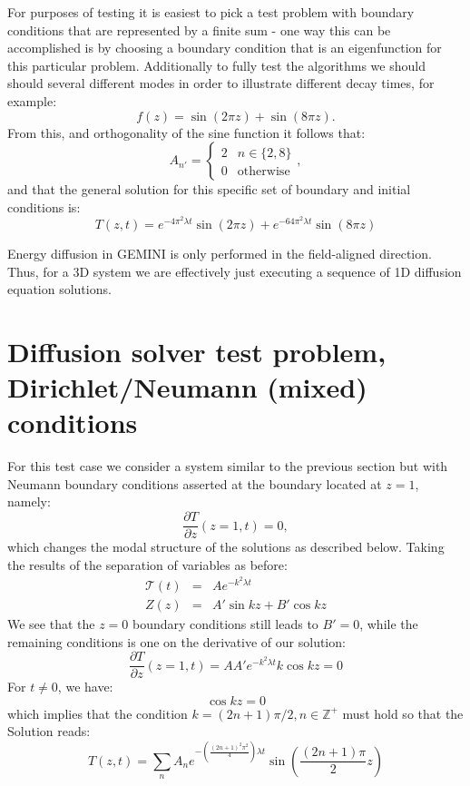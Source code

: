 \documentclass[11pt,letterpaper]{article}
\begin{document}
For purposes of testing it is easiest to pick a test problem with boundary conditions that are represented by a finite sum - one way this can be accomplished is by choosing a boundary condition that is an eigenfunction for this particular problem.  Additionally to fully test the algorithms we should should several different modes in order to illustrate different decay times, for example:  
\begin{equation}
 f(z) = \sin(2 \pi z) + \sin(8 \pi z).
\end{equation}
From this, and orthogonality of the sine function it follows that:
\begin{equation}
A_{n'} = \left\{ \begin{array}{cc} 2 & n \in \{2,8\} \\ 0 & \mathrm{otherwise}  \end{array} \right. ,
\end{equation}
and that the general solution for this specific set of boundary and initial conditions is:  
\begin{equation}
T(z,t) = e^{-4 \pi^2 \lambda t} \sin \left( 2 \pi z \right)+e^{-64 \pi^2 \lambda t} \sin \left( 8 \pi z \right)
\end{equation}

Energy diffusion in GEMINI is only performed in the field-aligned direction.  Thus, for a 3D system we are effectively just executing a sequence of 1D diffusion equation solutions.  


\section{Diffusion solver test problem, Dirichlet/Neumann (mixed) conditions}

For this test case we consider a system similar to the previous section but with Neumann boundary conditions asserted at the boundary located at $z=1$, namely:
\begin{equation}
  \frac{\partial T}{\partial z} \left( z=1, t\right) = 0,
\end{equation} 
which changes the modal structure of the solutions as described below.  Taking the results of the separation of variables as before:
\begin{eqnarray}
\mathcal{T}(t) &=& A e^{-k^2 \lambda t} \\
Z(z) &=& A' \sin kz + B' \cos kz
\end{eqnarray}
We see that the $z=0$ boundary conditions still leads to $B'=0$, while the remaining conditions is one on the derivative of our solution:
\begin{equation}
    \frac{\partial T}{\partial z} \left( z=1, t\right) = AA' e^{-k^2 \lambda t} k \cos kz = 0
\end{equation}
For $t \ne 0$, we have:  
\begin{equation}
\cos kz = 0
\end{equation}
which implies that the condition $k=(2n+1) \pi /2, n \in \mathbb{Z}^+$ must hold so that the Solution reads:
\begin{equation}
T(z,t)= \sum_n A_n e^{-\left( \frac{(2n+1)^2 \pi^2}{4}\right) \lambda t} \sin \left( \frac{(2n+1)\pi}{2} z \right)
\end{equation}
\end{document}
